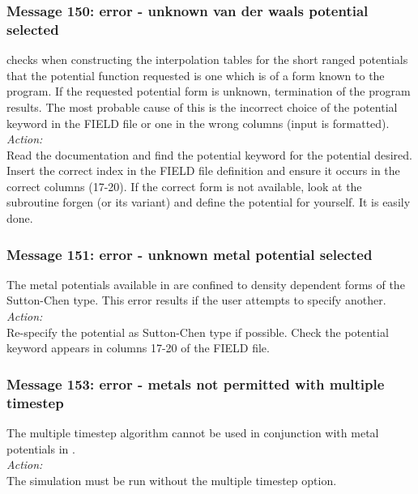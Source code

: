 \subsubsection*{Message 150: error - unknown van der waals potential selected}

\D{} checks when constructing the interpolation tables for the short ranged
potentials that the potential function requested is
one which is of a form known to the program. If the requested
potential form is unknown, termination of the program results.
The most probable cause of this is the incorrect choice of the potential
keyword in the FIELD file or one in the wrong columns (input is formatted). \\ 

\noindent
{\em Action:} \\ 
Read the \D{} documentation and find the potential keyword for the
potential desired. Insert the correct index in the FIELD file
definition and ensure it occurs in the correct columns (17-20).
If the correct form is not available, look at the
subroutine {\sc forgen} (or its variant) and define the potential
for yourself. It is easily done.

\subsubsection*{Message 151: error - unknown metal potential selected}

The metal potentials  available in \D{} are confined to density
dependent forms of the Sutton-Chen type. This error results if the
user attempts to specify another.\\

\noindent
{\em Action:} \\
Re-specify the potential as Sutton-Chen type if possible. Check the potential keyword
appears in columns 17-20 of the FIELD file.

\subsubsection*{Message 153: error - metals not permitted with multiple timestep}

The multiple timestep algorithm  cannot be used in conjunction with
metal potentials in \D{}. \\

\noindent
{\em Action:} \\
The simulation must be run without the multiple timestep option.

